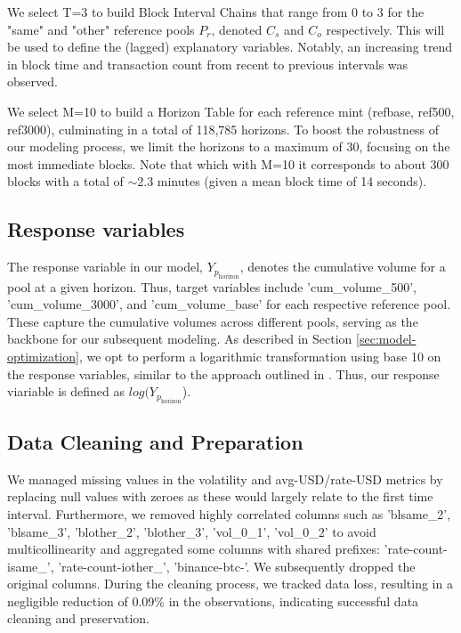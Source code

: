 \documentclass{article}
\begin{document}
We select T=3 to build Block Interval Chains that range from 0 to 3 for the "same" and "other" reference pools \(P_r\), denoted \(C_s\) and \(C_o\) respectively. This will be used to define the (lagged) explanatory variables. Notably, an increasing trend in block time and transaction count from recent to previous intervals was observed.

We select M=10 to build a Horizon Table for each reference mint (refbase, ref500, ref3000), culminating in a total of 118,785 horizons. To boost the robustness of our modeling process, we limit the horizons to a maximum of 30, focusing on the most immediate blocks. Note that which with M=10 it corresponds to about 300 blocks with a total of $\sim$2.3 minutes (given a mean block time of 14 seconds).

\subsection{Response variables}

The response variable in our model, \(Y_{p_{\text{horizon}}}\), denotes the cumulative volume for a pool at a given horizon. Thus, target variables include 'cum\_volume\_500', 'cum\_volume\_3000', and 'cum\_volume\_base' for each respective reference pool. These capture the cumulative volumes across different pools, serving as the backbone for our subsequent modeling. As described in Section \ref{sec:model-optimization}, we opt to perform a logarithmic transformation using base 10 on the response variables, similar to the approach outlined in \cite{Miori2023}. Thus, our response viariable is defined as \(log(Y_{p_{\text{horizon}}}\)).


\subsection{Data Cleaning and Preparation}

We managed missing values in the volatility and avg-USD/rate-USD metrics by replacing null values with zeroes as these would largely relate to the first time interval. Furthermore, we removed highly correlated columns such as 'blsame\_2', 'blsame\_3', 'blother\_2', 'blother\_3', 'vol\_0\_1', 'vol\_0\_2' to avoid multicollinearity and aggregated some columns with shared prefixes: 'rate-count-isame\_', 'rate-count-iother\_', 'binance-btc-'. We subsequently dropped the original columns. During the cleaning process, we tracked data loss, resulting in a negligible reduction of 0.09\% in the observations, indicating successful data cleaning and preservation.
\end{document}
